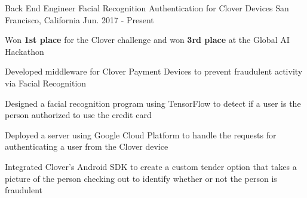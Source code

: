 \begin{cventries}


\cventry
{Back End Engineer} %
{Facial Recognition Authentication for Clover Devices} %
{San Francisco, California} %
{Jun. 2017 - Present} %
{ %
\begin{cvitems}
\item {Won \textbf{1st place} for the Clover challenge and won \textbf{3rd place} at the Global AI Hackathon}
\item {Developed middleware for Clover Payment Devices to prevent fraudulent activity via Facial Recognition}
\item {Designed a facial recognition program using TensorFlow to detect if a user is the person authorized to use the credit card}
\item {Deployed a server using Google Cloud Platform to handle the requests for authenticating a user from the Clover device}
\item {Integrated Clover's Android SDK to create a custom tender option that takes a picture of the person checking out to identify whether or not the person is fraudulent}
\end{cvitems}
}

\begin{comment}
\cventry
{Team Lead} %
{Machine Learning API} %
{San Francisco, California} %
{Jun. 2017 - Present} %
{ %
\begin{cvitems}
\item {Designed an API for commonly used machine learning models to support Hackathon team's artificial intelligence applications}
\item {Deployed an API via Google Cloud to interface Clover payment devices and Chui's API}
\end{cvitems}
}
\end{comment}

\begin{comment}
\cventry
{Solo} %
{Text File Compression} %
{San Luis Obispo, California} %
{Oct. 2016 - Nov. 2016} %
{ %
\begin{cvitems}
\item {Implemented Huffman Coding to compress text files in Java and C}
\item {Designed complimentary encoding program to compress files into characters to serve an educational purpose for those learning how compression works}
\end{cvitems}
}
\end{comment}


\end{cventries}
